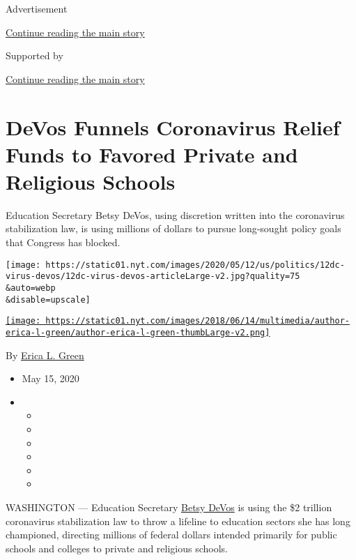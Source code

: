 Advertisement

\protect\hyperlink{after-top}{Continue reading the main story}

Supported by

\protect\hyperlink{after-sponsor}{Continue reading the main story}

\hypertarget{devos-funnels-coronavirus-relief-funds-to-favored-private-and-religious-schools}{%
\section{DeVos Funnels Coronavirus Relief Funds to Favored Private and
Religious
Schools}\label{devos-funnels-coronavirus-relief-funds-to-favored-private-and-religious-schools}}

Education Secretary Betsy DeVos, using discretion written into the
coronavirus stabilization law, is using millions of dollars to pursue
long-sought policy goals that Congress has blocked.

\texttt{[image: https://static01.nyt.com/images/2020/05/12/us/politics/12dc-virus-devos/12dc-virus-devos-articleLarge-v2.jpg?quality=75\\\&auto=webp\\\&disable=upscale]}

\href{https://nytimes.com/by/erica-l-green}{\texttt{[image: https://static01.nyt.com/images/2018/06/14/multimedia/author-erica-l-green/author-erica-l-green-thumbLarge-v2.png]}}

By \href{https://nytimes.com/by/erica-l-green}{Erica L. Green}

\begin{itemize}
\item
  May 15, 2020
\item
  \begin{itemize}
  \item
  \item
  \item
  \item
  \item
  \item
  \end{itemize}
\end{itemize}

WASHINGTON --- Education Secretary
\href{https://www.nytimes.com/2020/05/20/us/politics/trump-betsy-devos-student-debt-forgiveness.html}{Betsy
DeVos} is using the \$2 trillion coronavirus stabilization law to throw
a lifeline to education sectors she has long championed, directing
millions of federal dollars intended primarily for public schools and
colleges to private and religious schools.

